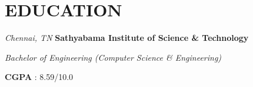 \section{EDUCATION}
\begin{twocolentry}{
    \textit{Chennai, TN}}
    \textbf{Sathyabama Institute of Science \& Technology}

    \textit{Bachelor of Engineering \small{(Computer Science \& Engineering)}}
\end{twocolentry}
    
\vspace{0.10 cm}

\begin{onecolentry}
    \textbf{CGPA} : 8.59/10.0
\end{onecolentry}




